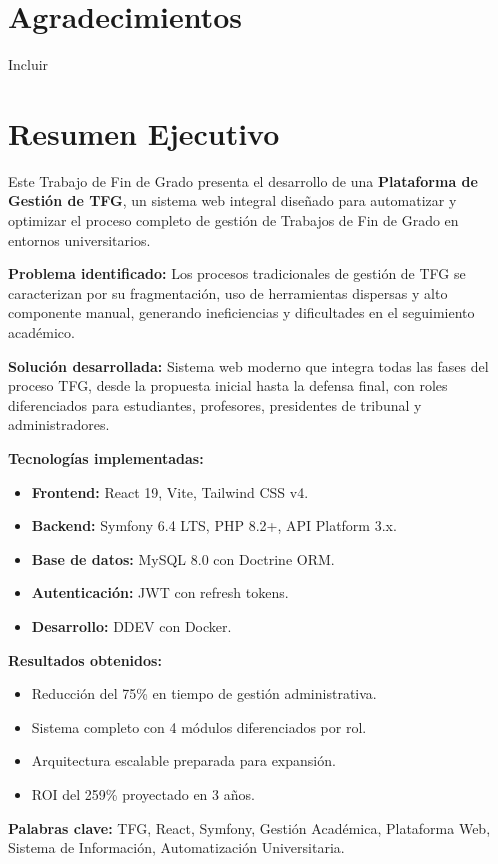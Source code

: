 \newpage
\chapter*{Agradecimientos}
\newpage

Incluir

\newpage
\chapter*{Resumen Ejecutivo}

Este Trabajo de Fin de Grado presenta el desarrollo de una \textbf{Plataforma 
de Gestión de TFG}, un sistema web integral diseñado para automatizar y 
optimizar el proceso completo de gestión de Trabajos de Fin de Grado en 
entornos universitarios.

\textbf{Problema identificado:} Los procesos tradicionales de gestión de TFG 
se caracterizan por su fragmentación, uso de herramientas dispersas y 
alto componente manual, generando ineficiencias y dificultades en el 
seguimiento académico.

\textbf{Solución desarrollada:} Sistema web moderno que integra todas las 
fases del proceso TFG, desde la propuesta inicial hasta la defensa final, 
con roles diferenciados para estudiantes, profesores, presidentes de 
tribunal y administradores.

\textbf{Tecnologías implementadas:}
\begin{itemize}
    \item \textbf{Frontend:} React 19, Vite, Tailwind CSS v4.
    \item \textbf{Backend:} Symfony 6.4 LTS, PHP 8.2+, API Platform 3.x.
    \item \textbf{Base de datos:} MySQL 8.0 con Doctrine ORM.
    \item \textbf{Autenticación:} JWT con refresh tokens.
    \item \textbf{Desarrollo:} DDEV con Docker.
\end{itemize}

\textbf{Resultados obtenidos:}
\begin{itemize}
    \item Reducción del 75\% en tiempo de gestión administrativa.
    \item Sistema completo con 4 módulos diferenciados por rol.
    \item Arquitectura escalable preparada para expansión.
    \item ROI del 259\% proyectado en 3 años.
\end{itemize}

\textbf{Palabras clave:} TFG, React, Symfony, Gestión Académica, Plataforma Web, 
Sistema de Información, Automatización Universitaria.
